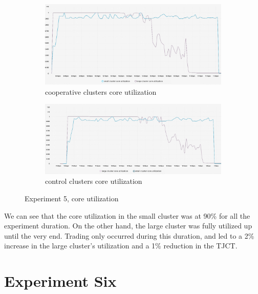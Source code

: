 \begin{figure}[H]
\centering
\begin{subfigure}{.5\textwidth}
  \centering
  \includegraphics[width=.9\linewidth]{./figures/experiment-five/alibaba-core-coop.png}
  \caption{cooperative clusters core utilization}
  \label{fig:exp5coopcore}
\end{subfigure}%
\begin{subfigure}{.5\textwidth}
  \centering
  \includegraphics[width=.9\linewidth]{./figures/experiment-five/alibaba-core-control.png}
  \caption{control clusters core utilization}
  \label{fig:exp5controlcore}
\end{subfigure}
\caption{Experiment 5, core utilization}
\label{fig:exp5coreutil}
\end{figure}

We can see that the core utilization in the small cluster was at 90\% for all
the experiment duration. On the other hand, the large cluster was fully
utilized up until the very end. Trading only occurred during this duration, and
led to a 2\% increase in the large cluster's utilization and a 1\% reduction in
the TJCT.

\section{Experiment Six}

